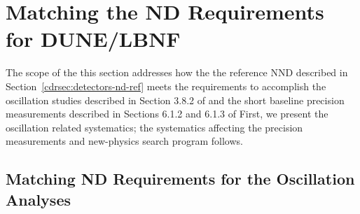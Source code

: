 
\section{Matching the ND Requirements for DUNE/LBNF} 
\label{cdrsec:detectors-nd-ref-fgt-req}

The scope of the this section addresses how the the reference NND
described in Section~\ref{cdrsec:detectors-nd-ref} meets the
requirements to accomplish the oscillation studies described in
Section 3.8.2 of \volphys %
and the short baseline precision measurements described in Sections 6.1.2
and 6.1.3 of \volphys %
First,
we present the oscillation related systematics; the systematics
affecting the precision measurements and new-physics search program
follows.


\subsection{Matching ND Requirements for the Oscillation Analyses} 
\label{cdrsec:detectors-nd-ref-fgt-req-oscl}

